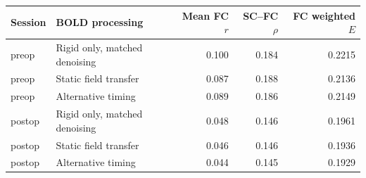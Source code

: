 \begin{tabular}{llrrr}
\toprule
Session & BOLD processing & Mean FC $r$ & SC--FC $\rho$ & FC weighted $E$ \\
\midrule
preop & Rigid only, matched denoising & 0.100 & 0.184 & 0.2215 \\
preop & Static field transfer & 0.087 & 0.188 & 0.2136 \\
preop & Alternative timing & 0.089 & 0.186 & 0.2149 \\
postop & Rigid only, matched denoising & 0.048 & 0.146 & 0.1961 \\
postop & Static field transfer & 0.046 & 0.146 & 0.1936 \\
postop & Alternative timing & 0.044 & 0.145 & 0.1929 \\
\bottomrule
\end{tabular}
